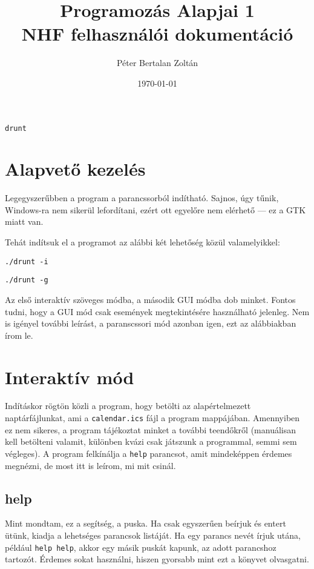 \documentclass[a4paper]{article}
\title{Programozás Alapjai 1 \\ NHF felhasználói dokumentáció}
\author{Péter Bertalan Zoltán}
\date{\today}
\begin{document}
	\begin{titlepage}
		\maketitle
		\vspace{4cm}
		\begin{center}
			\Huge
			\texttt{drunt}
		\end{center}
	\end{titlepage}

\section{Alapvető kezelés}

Legegyszerűbben a program a parancssorból indítható. Sajnos, úgy tűnik, Windows-ra nem sikerül lefordítani, ezért ott egyelőre nem elérhető --- ez a GTK miatt van.

Tehát indítsuk el a programot az alábbi két lehetőség közül valamelyikkel:

\begin{center}
	\texttt{./drunt -i} \par \texttt{./drunt -g}
\end{center}

Az első interaktív szöveges módba, a második GUI módba dob minket. Fontos tudni, hogy a GUI mód csak események megtekintésére használható jelenleg. Nem is igényel további leírást, a paranscssori mód azonban igen, ezt az alábbiakban írom le.

\section{Interaktív mód}

Indításkor rögtön közli a program, hogy betölti az alapértelmezett naptárfájlunkat, ami a \texttt{calendar.ics} fájl a program mappájában. Amennyiben ez nem sikeres, a program tájékoztat minket a további teendőkről (manuálisan kell betölteni valamit, különben kvázi csak játszunk a programmal, semmi sem végleges). A program felkínálja a \texttt{help} parancsot, amit mindeképpen érdemes megnézni, de most itt is leírom, mi mit csinál.

\subsection{help}

Mint mondtam, ez a segítség, a puska. Ha csak egyszerűen beírjuk és entert ütünk, kiadja a lehetséges parancsok listáját. Ha egy parancs nevét írjuk utána, például \texttt{help help}, akkor egy másik puskát kapunk, az adott parancshoz tartozót. Érdemes sokat használni, hiszen gyorsabb mint ezt a könyvet olvasgatni.
\end{document}
